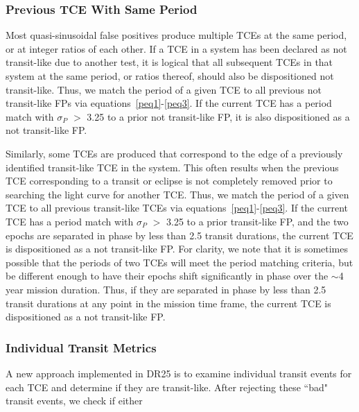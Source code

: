 

\subsubsection{Previous TCE With Same Period}
\label{s:sameperiod}
Most quasi-sinusoidal false positives produce multiple TCEs at the same period, or at integer ratios of each other. If a TCE in a system has been declared as not transit-like due to another test, it is logical that all subsequent TCEs in that system at the same period, or ratios thereof, should also be dispositioned not transit-like. Thus, we match the period of a given TCE to all previous not transit-like FPs via equations~\ref{peq1}-\ref{peq3}. If the current TCE has a period match with $\sigma_{P}$ $>$ 3.25 to a prior not transit-like FP, it is also dispositioned as a not transit-like FP.

Similarly, some TCEs are produced that correspond to the edge of a previously identified transit-like TCE in the system. This often results when the previous TCE corresponding to a transit or eclipse is not completely removed prior to searching the light curve for another TCE. Thus, we match the period of a given TCE to all previous transit-like TCEs via equations~\ref{peq1}-\ref{peq3}.  If the current TCE has a period match with $\sigma_{P}$ $>$ 3.25 to a prior transit-like FP, and the two epochs are separated in phase by less than 2.5 transit durations, the current TCE is dispositioned as a not transit-like FP. For clarity, we note that it is sometimes possible that the periods of two TCEs will meet the period matching criteria, but be different enough to have their epochs shift significantly in phase over the $\sim$4 year mission duration. Thus, if they are separated in phase by less than 2.5 transit durations at any point in the mission time frame, the current TCE is dispositioned as a not transit-like FP.



\subsubsection{Individual Transit Metrics}
\label{s:indivtrans}
A new approach implemented in DR25 is to examine individual transit events for each TCE and determine if they are transit-like. After rejecting these ``bad" transit events, we check if either

